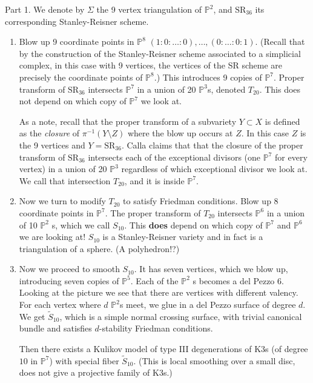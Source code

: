 Part 1. We denote by $\Sigma$ the
9 vertex triangulation of  $\mathbb{P}^2$,
and $\text{SR}_{36}$ its corresponding
Stanley-Reisner scheme.

\begin{enumerate}

\item Blow up 9 coordinate points in $\mathbb{P}^8$ 
$(1:0:\ldots:0),\ldots,(0:\ldots:0:1)$.
(Recall that by the construction of the
Stanley-Reisner scheme associated to
a simplicial complex, in this case with 9
vertices, the vertices of the SR scheme
are precisely the coordinate points of $\mathbb{P}^8$.)
This introduces 9 copies of $\mathbb{P}^7$.
Proper transform of  $\text{SR}_{36}$
intersects $\mathbb{P}^7$ in a union
of  20 $\mathbb{P}^3$s, denoted $T_{20}$.
This does not depend on which copy of $\mathbb{P}^7$ 
we look at.

As a note, recall that the proper
transform of a subvariety $Y \subset X$ 
is defined as the {\it closure} of
$\pi^{-1}(Y\setminus Z)$ where
the blow up occurs at $Z$. In this case
$Z$ is the 9 vertices and $Y=\text{SR}_{36}$.
Calla claims that
that the closure of the proper
transform of $\text{SR}_{36}$ 
intersects each of the exceptional divisors
(one $\mathbb{P}^7$ for every vertex)
in a union of 20 $\mathbb{P}^3$ 
regardless of which exceptional divisor we
look at. We call that intersection $T_{20}$,
and it is inside $\mathbb{P}^7$.

\item Now we turn to modify $T_{20}$ 
to satisfy Friedman conditions.
Blow up 8 coordinate points in $\mathbb{P}^7$.
The proper transform of $T_{20}$ intersects
$\mathbb{P}^6$ in a union of 10 $\mathbb{P}^2$ s,
which we call $S_{10}$.
This {\bf does} depend on which copy of
$\mathbb{P}^7$ and $\mathbb{P}^6$ 
we are looking at!
$S_{10}$ is a Stanley-Reisner variety
and in fact is a triangulation of a sphere.
(A polyhedron!?)

\item Now we proceed to smooth $S_{10}$.
It has seven vertices, which we blow up,
introducing seven copies of $\mathbb{P}^5$.
Each of the $\mathbb{P}^2$ s becomes
a del Pezzo 6.
Looking at the picture we
see that there are vertices with
different valency. For each vertex
where $d$ $\mathbb{P}^2$s meet,
we glue in a del Pezzo surface of 
degree $d$. 
We get $\tilde{S}_{10}$, which is a 
simple normal crossing surface,
with trivial canonical bundle
and satisfies $d$-stability 
Friedman conditions.

Then there exists a Kulikov model
of type III degenerations of K3s
(of degree $10$ in $\mathbb{P}^7$)
with special fiber $\tilde{S}_{10}$.
(This is local smoothing over a
small disc, does not give a projective
family of K3s.)
\end{enumerate}

